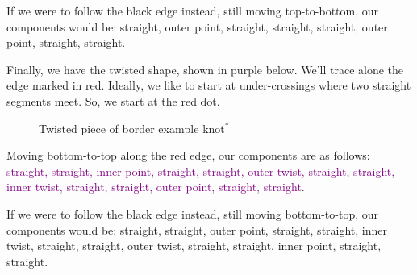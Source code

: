 \documentclass[openany]{book}
\newcommand{\gen}{\hyperref[generated]{$^*$}}%
\newcommand{\bk}{border example knot}
\begin{document}
If we were to follow the black edge instead, still moving top-to-bottom, our components would be: straight, outer point, straight, straight, straight, outer point, straight, straight.
\medskip

Finally, we have the twisted shape, shown in purple below. We'll trace alone the edge marked in red. Ideally, we like to start at under-crossings where two straight segments meet. So, we start at the red dot.

\begin{figure}[H]\centering
{}
\caption{Twisted piece of \bk\gen}
\end{figure}
Moving bottom-to-top along the red edge, our components are as follows: \textcolor{purple}{ straight, straight, inner point, straight, straight, outer twist, straight, straight, inner twist, straight, straight, outer point, straight, straight}.

If we were to follow the black edge instead, still moving bottom-to-top, our components would be: straight, straight, outer point, straight, straight, inner twist, straight, straight, outer twist, straight, straight, inner point, straight, straight.
%
%
%

\end{document}
